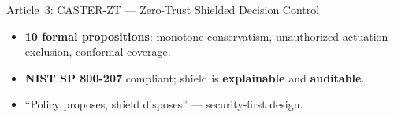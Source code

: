 \documentclass[final]{beamer}
\newlength{\colwidth}
\begin{document}
\begin{frame}[t]
\begin{columns}[t]
\begin{column}{\colwidth}
\begin{block}{Article~3: CASTER-ZT --- Zero-Trust Shielded Decision Control}
\begin{center}
    \end{center}

    \begin{itemize}
      \item \textbf{10 formal propositions}: monotone conservatism, unauthorized-actuation exclusion, conformal coverage.
      \item \textbf{NIST SP 800-207} compliant; shield is \textbf{explainable} and \textbf{auditable}.
      \item ``Policy proposes, shield disposes'' --- security-first design.
    \end{itemize}
  \end{block}


\end{column}
\end{columns}
\end{frame}
\end{document}
